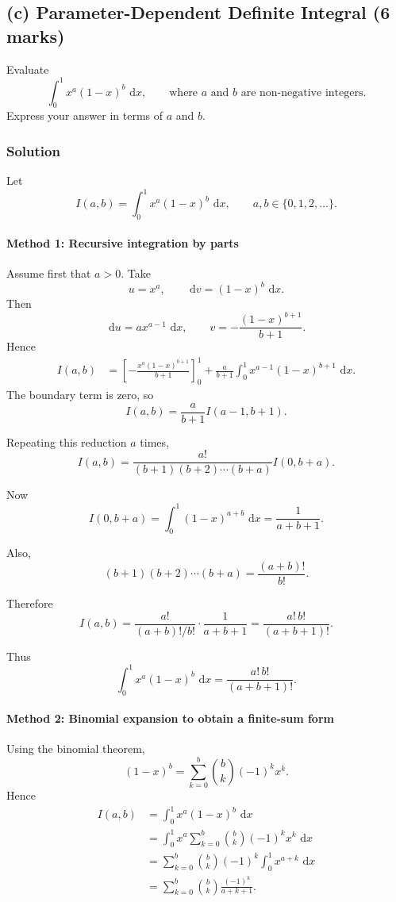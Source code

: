 \documentclass[12pt]{article}
\newcommand{\dd}{\,\mathrm{d}}
\begin{document}
\newpage
\subsection{(c) Parameter-Dependent Definite Integral \hfill (6 marks)}

Evaluate
\[
\int_0^1 x^a(1-x)^b\,\dd x,
\qquad \text{where \(a\) and \(b\) are non-negative integers.}
\]
Express your answer in terms of \(a\) and \(b\).

\subsubsection*{Solution}

Let
\[
I(a,b)=\int_0^1 x^a(1-x)^b\,\dd x,
\qquad a,b\in \{0,1,2,\dots\}.
\]

\paragraph{Method 1: Recursive integration by parts}

Assume first that \(a>0\). Take
\[
u=x^a,\qquad \dd v=(1-x)^b\,\dd x.
\]
Then
\[
\dd u=ax^{a-1}\,\dd x,
\qquad
v=-\frac{(1-x)^{b+1}}{b+1}.
\]
Hence
\begin{align*}
I(a,b)
&=\left[-\frac{x^a(1-x)^{b+1}}{b+1}\right]_0^1
+\frac{a}{b+1}\int_0^1 x^{a-1}(1-x)^{b+1}\,\dd x.
\end{align*}
The boundary term is zero, so
\[
I(a,b)=\frac{a}{b+1}I(a-1,b+1).
\]

Repeating this reduction \(a\) times,
\[
I(a,b)
=\frac{a!}{(b+1)(b+2)\cdots(b+a)}I(0,b+a).
\]

Now
\[
I(0,b+a)=\int_0^1(1-x)^{a+b}\,\dd x
=\frac{1}{a+b+1}.
\]

Also,
\[
(b+1)(b+2)\cdots(b+a)=\frac{(a+b)!}{b!}.
\]

Therefore
\[
I(a,b)=\frac{a!}{(a+b)!/b!}\cdot\frac{1}{a+b+1}
=\frac{a!\,b!}{(a+b+1)!}.
\]

Thus
\[
\boxed{\int_0^1 x^a(1-x)^b\,\dd x=\frac{a!\,b!}{(a+b+1)!}.}
\]

\paragraph{Method 2: Binomial expansion to obtain a finite-sum form}

Using the binomial theorem,
\[
(1-x)^b=\sum_{k=0}^{b}\binom{b}{k}(-1)^k x^k.
\]
Hence
\begin{align*}
I(a,b)
&=\int_0^1 x^a(1-x)^b\,\dd x \\
&=\int_0^1 x^a\sum_{k=0}^{b}\binom{b}{k}(-1)^k x^k\,\dd x \\
&=\sum_{k=0}^{b}\binom{b}{k}(-1)^k\int_0^1 x^{a+k}\,\dd x \\
&=\sum_{k=0}^{b}\binom{b}{k}\frac{(-1)^k}{a+k+1}.
\end{align*}
\end{document}
